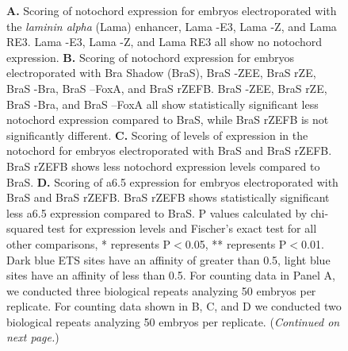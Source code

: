 \begin{figure}[p]
    \centering
    \caption[Scoring of manipulated notochord enhancers]{\textbf{A.} Scoring of notochord expression for embryos electroporated with the \textit{laminin alpha} (Lama) enhancer, Lama -E3, Lama -Z, and Lama RE3. Lama -E3, Lama -Z, and Lama RE3 all show no notochord expression. \textbf{B.} Scoring of notochord expression for embryos electroporated with Bra Shadow (BraS), BraS -ZEE, BraS rZE, BraS -Bra, BraS –FoxA, and BraS rZEFB. BraS -ZEE, BraS rZE, BraS -Bra, and BraS –FoxA all show statistically significant less notochord expression compared to BraS, while BraS rZEFB is not significantly different. \textbf{C.} Scoring of levels of expression in the notochord for embryos electroporated with BraS and BraS rZEFB. BraS rZEFB shows less notochord expression levels compared to BraS. \textbf{D.} Scoring of a6.5 expression for embryos electroporated with BraS and BraS rZEFB. BraS rZEFB shows statistically significant less a6.5 expression compared to BraS. P values calculated by chi-squared test for expression levels and Fischer’s exact test for all other comparisons, * represents P$<$0.05, ** represents P$<$0.01. Dark blue ETS sites have an affinity of greater than 0.5, light blue sites have an affinity of less than 0.5. For counting data in Panel A, we conducted three biological repeats analyzing 50 embryos per replicate. For counting data shown in B, C, and D we conducted two biological repeats analyzing 50 embryos per replicate. (\textit{Continued on next page.})}
    \label{fig:supplement manipulated enhancers}
\end{figure}

\addtocounter{figure}{-1}

